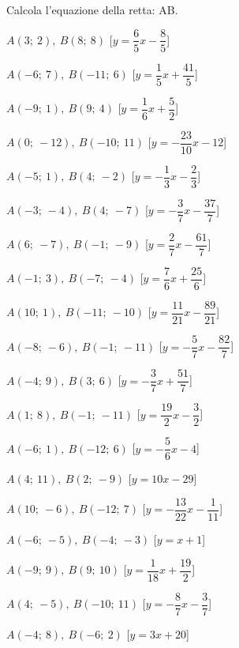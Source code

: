 \subsubsection*{}

\begin{esercizio}\label{ese:}
 Calcola l'equazione della retta: AB.
\begin{multicols}{2}
 \begin{enumeratea}
  \item  \(A(3;~2),~B(8;~8)\) \hfill 
   [\(y = \dfrac{6}{5} x -\dfrac{8}{5}\)]
  \item  \(A(-6;~7),~B(-11;~6)\) \hfill 
   [\(y = \dfrac{1}{5} x +\dfrac{41}{5}\)]
  \item  \(A(-9;~1),~B(9;~4)\) \hfill 
   [\(y = \dfrac{1}{6} x +\dfrac{5}{2}\)]
  \item  \(A(0;~-12),~B(-10;~11)\) \hfill 
   [\(y = -\dfrac{23}{10} x -12\)]
  \item  \(A(-5;~1),~B(4;~-2)\) \hfill 
   [\(y = -\dfrac{1}{3} x -\dfrac{2}{3}\)]
  \item  \(A(-3;~-4),~B(4;~-7)\) \hfill 
   [\(y = -\dfrac{3}{7} x -\dfrac{37}{7}\)]
  \item  \(A(6;~-7),~B(-1;~-9)\) \hfill 
   [\(y = \dfrac{2}{7} x -\dfrac{61}{7}\)]
  \item  \(A(-1;~3),~B(-7;~-4)\) \hfill 
   [\(y = \dfrac{7}{6} x +\dfrac{25}{6}\)]
  \item  \(A(10;~1),~B(-11;~-10)\) \hfill 
   [\(y = \dfrac{11}{21} x -\dfrac{89}{21}\)]
  \item  \(A(-8;~-6),~B(-1;~-11)\) \hfill 
   [\(y = -\dfrac{5}{7} x -\dfrac{82}{7}\)]
  \item  \(A(-4;~9),~B(3;~6)\) \hfill 
   [\(y = -\dfrac{3}{7} x +\dfrac{51}{7}\)]
  \item  \(A(1;~8),~B(-1;~-11)\) \hfill 
   [\(y = \dfrac{19}{2} x -\dfrac{3}{2}\)]
  \item  \(A(-6;~1),~B(-12;~6)\) \hfill 
   [\(y = -\dfrac{5}{6} x -4\)]
  \item  \(A(4;~11),~B(2;~-9)\) \hfill 
   [\(y = 10 x -29\)]
  \item  \(A(10;~-6),~B(-12;~7)\) \hfill 
   [\(y = -\dfrac{13}{22} x -\dfrac{1}{11}\)]
  \item  \(A(-6;~-5),~B(-4;~-3)\) \hfill 
   [\(y = x +1\)]
  \item  \(A(-9;~9),~B(9;~10)\) \hfill 
   [\(y = \dfrac{1}{18} x +\dfrac{19}{2}\)]
  \item  \(A(4;~-5),~B(-10;~11)\) \hfill 
   [\(y = -\dfrac{8}{7} x -\dfrac{3}{7}\)]
  \item  \(A(-4;~8),~B(-6;~2)\) \hfill 
   [\(y = 3 x +20\)]
 \end{enumeratea}
\end{multicols}
\end{esercizio}

